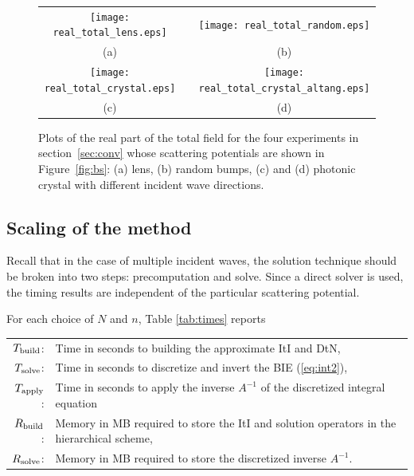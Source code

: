 \documentclass[11pt,final]{amsart}
\theoremstyle{definition}
\numberwithin{remark}{section}
\numberwithin{definition}{section}
\numberwithin{pro}{section}
\begin{document}
\begin{figure}[ht]
\hspace{-5ex}
 \begin{tabular}{ccc}
\texttt{[image: real\_total\_lens.eps]}&\mbox{}& \texttt{[image: real\_total\_random.eps]}\\
(a)& \mbox{}& (b)\\
\texttt{[image: real\_total\_crystal.eps]}& \mbox{}& \texttt{[image: real\_total\_crystal\_altang.eps]}\\
(c) & \mbox{}& (d) \\
   \end{tabular}
\caption{\label{fig:fields}%
Plots of the real part of the total field for the four experiments in section~\ref{sec:conv}
whose scattering potentials are shown in Figure~\ref{fig:bs}:
(a) lens, (b) random bumps, (c) and (d) photonic crystal with different incident wave directions.}
\end{figure}


\subsection{Scaling of the method}
\label{sec:time}
Recall that in the case of multiple incident waves, the solution technique
should be broken into two steps: precomputation and solve.  Since a direct
solver is used, the timing results are independent of the particular scattering potential.

For each choice of $N$ and $n$, Table \ref{tab:times}
reports

\vspace{.5ex}
\begin{tabular}{rl}
$T_{\rm build}$:& Time in seconds to building the approximate ItI and DtN,\\
$T_{\rm solve}$:& Time in seconds to discretize and invert the BIE (\ref{eq:int2}),\\
$T_{\rm apply}$:& Time in seconds to apply the inverse $A^{-1}$
of the discretized integral equation\\
$R_{\rm build}$: & Memory in MB required to store the ItI and solution operators in
the hierarchical scheme,\\
$R_{\rm solve}$: & Memory in MB required to store the discretized inverse $A^{-1}$.
\end{tabular}
\vspace{.5ex}
\end{document}
